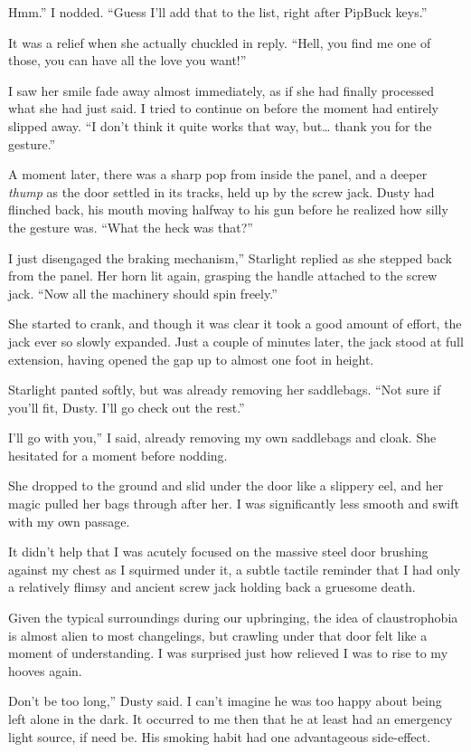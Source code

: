 \leavevmode{}Hmm.” I nodded. “Guess I’ll add that to the list, right after PipBuck keys.”

It was a relief when she actually chuckled in reply. “Hell, you find me one of those, you can have all the love you want!”

I saw her smile fade away almost immediately, as if she had finally processed what she had just said. I tried to continue on before the moment had entirely slipped away. “I don’t think it quite works that way, but… thank you for the gesture.”

A moment later, there was a sharp pop from inside the panel, and a deeper \textit{thump} as the door settled in its tracks, held up by the screw jack. Dusty had flinched back, his mouth moving halfway to his gun before he realized how silly the gesture was. “What the heck was that?”

\leavevmode{}I just disengaged the braking mechanism,” Starlight replied as she stepped back from the panel. Her horn lit again, grasping the handle attached to the screw jack. “Now all the machinery should spin freely.”

She started to crank, and though it was clear it took a good amount of effort, the jack ever so slowly expanded. Just a couple of minutes later, the jack stood at full extension, having opened the gap up to almost one foot in height.

Starlight panted softly, but was already removing her saddlebags. “Not sure if you’ll fit, Dusty. I’ll go check out the rest.”

\leavevmode{}I’ll go with you,” I said, already removing my own saddlebags and cloak. She hesitated for a moment before nodding.

She dropped to the ground and slid under the door like a slippery eel, and her magic pulled her bags through after her. I was significantly less smooth and swift with my own passage.

It didn’t help that I was acutely focused on the massive steel door brushing against my chest as I squirmed under it, a subtle tactile reminder that I had only a relatively flimsy and ancient screw jack holding back a gruesome death.

Given the typical surroundings during our upbringing, the idea of claustrophobia is almost alien to most changelings, but crawling under that door felt like a moment of understanding. I was surprised just how relieved I was to rise to my hooves again.

\leavevmode{}Don’t be too long,” Dusty said. I can’t imagine he was too happy about being left alone in the dark. It occurred to me then that he at least had an emergency light source, if need be. His smoking habit had one advantageous side-effect.

